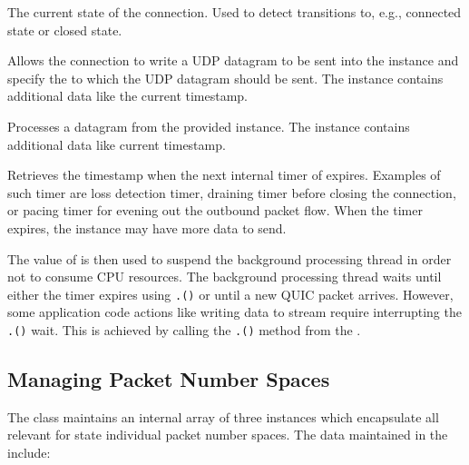 \begin{description}

   The current state of the connection. Used to detect transitions to, e.g., connected state or closed state.

  Allows the connection to write a UDP datagram to be sent into the \QuicWriter{} instance and specify the  to which the UDP datagram should be sent. The  instance contains additional data like the current timestamp.

  Processes a datagram from the provided \QuicReader{} instance. The  instance contains additional data like current timestamp.

  Retrieves the timestamp when the next internal timer of expires. Examples of such timer are loss detection timer, draining timer before closing the connection, or pacing timer for evening out the outbound packet flow. When the timer expires, the \ManagedQuicConnection{} instance may have more data to send.

\end{description}

The value of  is then used to suspend the background processing thread
in order not to consume CPU resources. The background processing thread waits until either the timer
expires using \texttt{.()} or until a new QUIC packet arrives. However,
some application code actions like writing data to stream require interrupting the
\texttt{.()} wait. This is achieved by calling the
\texttt{\QuicConnectionContext{}.()} method from the \ManagedQuicConnection{}.

\subsection{Managing Packet Number Spaces}

The \ManagedQuicConnection{} class maintains an internal array of three \PacketNumberSpace{}
instances which encapsulate all relevant for state individual packet number spaces. The data
maintained in the \PacketNumberSpace{} include:

